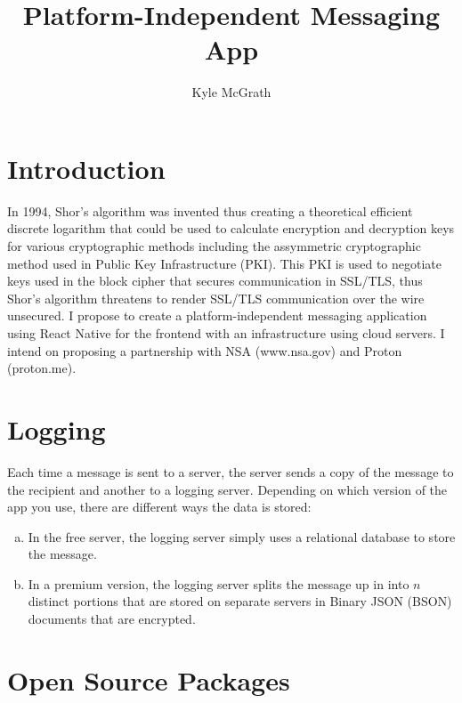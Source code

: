 \documentclass{article}
\title{Platform-Independent Messaging App}
\author{Kyle McGrath}
\begin{document}
\maketitle

\section{Introduction}
In 1994, Shor's algorithm was invented thus creating a theoretical efficient discrete logarithm that could be used to calculate encryption and decryption keys for various cryptographic methods including the assymmetric cryptographic method used in Public Key Infrastructure (PKI). This PKI is used to negotiate keys used in the block cipher that secures communication in SSL/TLS, thus Shor's algorithm threatens to render SSL/TLS communication over the wire unsecured. I propose to create a platform-independent messaging application using React Native for the frontend with an infrastructure using cloud servers. I intend on proposing a partnership with NSA (www.nsa.gov) and Proton (proton.me).

\section{Logging}
Each time a message is sent to a server, the server sends a copy of the message to the recipient and another to a logging server. Depending on which version of the app you use, there are different ways the data is stored:
\begin{enumerate}[(a)]
\item In the free server, the logging server simply uses a relational database to store the message. 
\item In a premium version, the logging server splits the message up in into $n$ distinct portions that are stored on separate servers in Binary JSON (BSON) documents that are encrypted. 
\end{enumerate}

\section{Open Source Packages}
\end{document}
